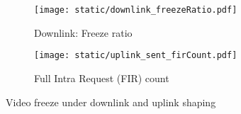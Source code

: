 \begin{figure}[t]
    \centering
    \begin{subfigure}[t]{0.35\textwidth}      
        \texttt{[image: static/downlink\_freezeRatio.pdf]}
        \caption{Downlink: Freeze ratio}
 		\label{subfig:downlink_freeze_ratio}
    \end{subfigure}
	\begin{subfigure}[t]{0.35\textwidth}   
        \centering
        \texttt{[image: static/uplink\_sent\_firCount.pdf]}
        \vspace{-2em}
    \caption{Full Intra Request (FIR) count}
    \label{subfig:uplink_fir}
    \end{subfigure}%
	\caption{Video freeze under downlink and uplink shaping}
	\label{fig:video_freeze}
\end{figure}







